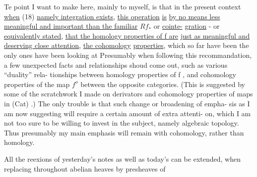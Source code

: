 Te point I want to make here, mainly to myself, is that in the
present context \uline{when} (18) \uline{namely integration exists}, \uline{this operation} \uline{is}
\uline{by no means less meaningful and important than the familiar} $Rf_{*}$ or \uline{cointe-}%
\uline{gration} - or \uline{equivalently stated}, \uline{that the homology properties of f are}
\uline{just as meaningful and deserving close attention},  \uline{the cohomology}
\uline{properties}, which so far have been the only ones  have been looking at
Presumably when following this recommandation, a few unexpected 
facts and relationships shoud come out, such as various ``duality'' rela-%
tionships between homology properties of f , and cohomology properties
of the map $f^{o}$ between the opposite categories. (This is suggested by some
of the scratchwork I made on derivators and cohomology properties of maps
in (Cat) .) The only trouble is that such change or broadening of empha-%
sis as I am now suggesting will require a certain amount of extra attenti-%
on, which I am not too sure to be willing to invest in the subject,
namely algebraic topology. Thus presumably my main emphasis will remain
\margin{\unsure{$\updownarrow$}} with cohomology, rather than homology. 

 All the reexions of yesterday's notes as well as today's can
be extended, when replacing throughout abelian heaves by presheaves of

